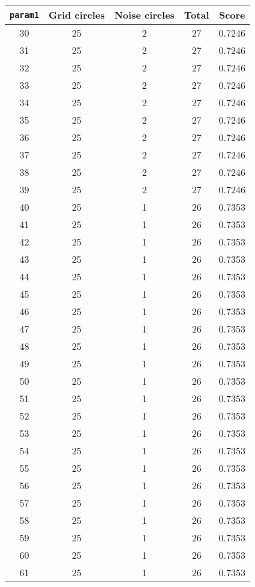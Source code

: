 \documentclass[letterpaper, 12pt]{article}
\begin{document}
\begin{longtable}{|c|c|c|c|c|}
\hline
\textbf{\texttt{param1}} & \textbf{Grid circles} & \textbf{Noise circles} & \textbf{Total} & \textbf{Score} \\
\hline
30 & 25 & 2 & 27 & 0.7246 \\
\hline
31 & 25 & 2 & 27 & 0.7246 \\
\hline
32 & 25 & 2 & 27 & 0.7246 \\
\hline
33 & 25 & 2 & 27 & 0.7246 \\
\hline
34 & 25 & 2 & 27 & 0.7246 \\
\hline
35 & 25 & 2 & 27 & 0.7246 \\
\hline
36 & 25 & 2 & 27 & 0.7246 \\
\hline
37 & 25 & 2 & 27 & 0.7246 \\
\hline
38 & 25 & 2 & 27 & 0.7246 \\
\hline
39 & 25 & 2 & 27 & 0.7246 \\
\hline
40 & 25 & 1 & 26 & 0.7353 \\
\hline
41 & 25 & 1 & 26 & 0.7353 \\
\hline
42 & 25 & 1 & 26 & 0.7353 \\
\hline
43 & 25 & 1 & 26 & 0.7353 \\
\hline
44 & 25 & 1 & 26 & 0.7353 \\
\hline
45 & 25 & 1 & 26 & 0.7353 \\
\hline
46 & 25 & 1 & 26 & 0.7353 \\
\hline
47 & 25 & 1 & 26 & 0.7353 \\
\hline
48 & 25 & 1 & 26 & 0.7353 \\
\hline
49 & 25 & 1 & 26 & 0.7353 \\
\hline
50 & 25 & 1 & 26 & 0.7353 \\
\hline
51 & 25 & 1 & 26 & 0.7353 \\
\hline
52 & 25 & 1 & 26 & 0.7353 \\
\hline
53 & 25 & 1 & 26 & 0.7353 \\
\hline
54 & 25 & 1 & 26 & 0.7353 \\
\hline
55 & 25 & 1 & 26 & 0.7353 \\
\hline
56 & 25 & 1 & 26 & 0.7353 \\
\hline
57 & 25 & 1 & 26 & 0.7353 \\
\hline
58 & 25 & 1 & 26 & 0.7353 \\
\hline
59 & 25 & 1 & 26 & 0.7353 \\
\hline
60 & 25 & 1 & 26 & 0.7353 \\
\hline
61 & 25 & 1 & 26 & 0.7353 \\

\end{longtable}
\end{document}
